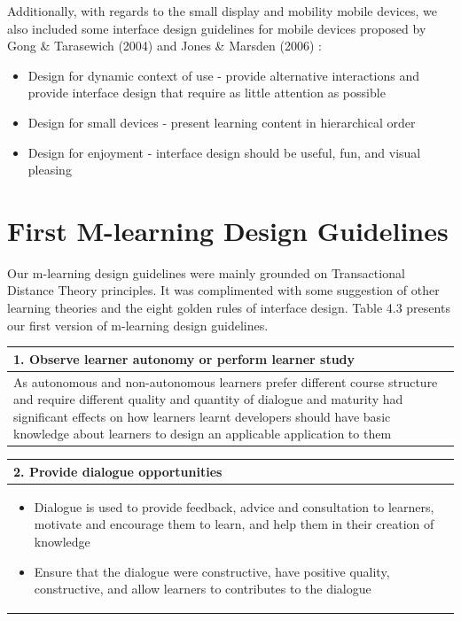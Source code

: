 Additionally, with regards to the small display and mobility mobile devices, we also included some interface design guidelines for mobile devices proposed by  Gong \& Tarasewich (2004) \cite{gong2004guidelines} and Jones \& Marsden (2006) \cite{jones2006mobile}: 

\begin{itemize} 
\item Design for dynamic context of use - provide alternative interactions and provide interface design that require as little attention as possible
\item Design for small devices - present learning content in hierarchical order 
\item Design for enjoyment - interface design should be useful, fun, and visual pleasing 
\end{itemize} 

\section{First M-learning Design Guidelines} 
Our m-learning design guidelines were mainly grounded on Transactional Distance Theory principles. It was complimented with some suggestion of other learning theories and the eight golden rules of interface design. Table 4.3 presents our first version of m-learning design guidelines. 

\begin{table}[H]
\centering
\begin{tabular}{ |p{13 cm}|} 
\hline
\textbf{1. Observe learner autonomy or perform learner study}\\
\hline 
As autonomous and non-autonomous learners prefer different course structure and require different quality and quantity of dialogue and maturity had significant effects on how learners learnt developers should have basic knowledge about learners to design an applicable application to them

\\
\hline
\end{tabular}
\end{table}


\begin{table}[!htb]
\centering
\begin{tabular}{ |p{13 cm}|} 
 \hline
 \textbf{2. Provide dialogue opportunities} \\ 
\hline
\begin{itemize}
\item Dialogue is used to provide feedback, advice and consultation to learners, motivate and encourage them to learn, and help them in their creation of knowledge \item Ensure that the dialogue were constructive, have positive quality, constructive, and allow learners to contributes to the dialogue 
\end{itemize}\\
\hline
\end{tabular}
\end{table}

